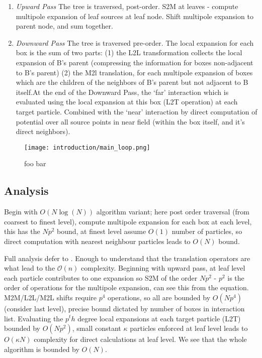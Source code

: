 \begin{enumerate}
    \item \textit{Upward Pass} The tree is traversed, post-order. S2M at leaves
    - compute multipole expansion of leaf sources at leaf node. Shift multipole
    expansion to parent node, and sum together.
    \item \textit{Downward Pass} The tree is traversed pre-order. The local expansion
    for each box is the sum of two parts: (1) the L2L transformation collects the local
    expansion of B's parent (compressing the information for boxes non-adjacent to B's parent)
    (2) the M2l translation, for each multipole expansion of boxes which are the children of
    the neighbors of B's parent but not adjacent to B itself.At the end of the
    Downward Pass, the `far' interaction which is evaluated
    using the local expansion at this box (L2T operation) at each target particle.
    Combined with the `near' interaction by direct computation of potential over all
    source points in near field (within the box itself, and it's direct neighbors).
\end{enumerate}


\begin{figure}[!h]
    \centering
    {\texttt{[image: introduction/main\_loop.png]}}
  \caption{foo bar}
  \label{fig:1_1_main_loop}
\end{figure}


\subsection{Analysis}

Begin with $O(N\log(N))$ algorithm variant; here post order traversal (from
coarsest to finest level), compute multipole expansion for each box at each level,
this has the $Np^2$ bound, at finest level assume $O(1)$ number of particles, so
direct computation with nearest neighbour particles leads to $O(N)$ bound.

Full analysis defer to \cite{Greengard:1987:Yale}. Enough to understand that the
translation operators are what lead to the $\mathcal{O}(n)$ complexity. Beginning
with upward pass, at leaf level each particle contributes to one expansion so
S2M of the order $Np^2$ - $p^2$ is the order of operations for the multipole
expansion, can see this from the equation. M2M/L2L/M2L shifts require $p^4$
operations, so all are bounded by $O(Np^4)$ (consider last level), precise bound
dictated by number of boxes in interaction list. Evaluating the $p^th$ degree
local expansions at each target particle (L2T) bounded by $O(Np^2)$, small constant
$\kappa$ particles enforced at leaf level leads to $O(\kappa N)$ complexity for
direct calculations at leaf level. We see that the whole algorithm is bounded by
$O(N)$.

\hspace{10pt}
